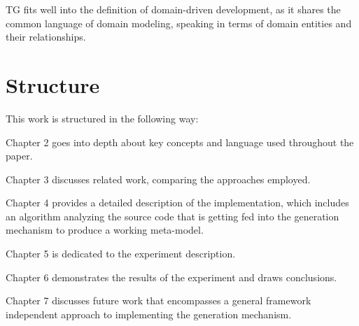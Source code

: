 \n

TG fits well into the definition of domain-driven development, as it shares the common language of domain modeling, speaking in terms of domain entities and their relationships.

\section{Structure}

This work is structured in the following way: 

\n

Chapter 2 goes into depth about key concepts and language used throughout the paper.

\n

Chapter 3 discusses related work, comparing the approaches employed.

\n

Chapter 4 provides a detailed description of the implementation, which includes an algorithm analyzing the source code that is getting fed into the generation mechanism to produce a working meta-model.

\n

Chapter 5 is dedicated to the experiment description.

\n

Chapter 6 demonstrates the results of the experiment and draws conclusions.

\n

Chapter 7 discusses future work that encompasses a general framework independent approach to implementing the generation mechanism.
